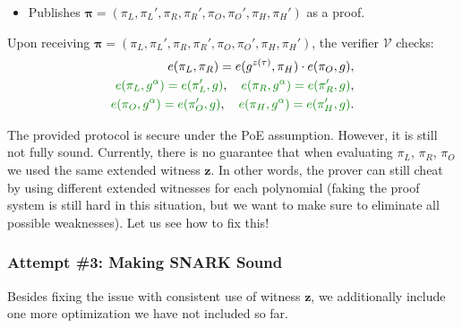 \documentclass[../lecture-notes-148x210.tex]{subfiles}
\begin{document}
\begin{tcolorbox}
\begin{itemize}[label=]
\begin{align*}
            \pi_R \gets g^{r(\tau)}, & \quad\textcolor{green!50!black}{\pi_R' \gets g^{\alpha r(\tau)}} \\
            \pi_O \gets g^{o(\tau)}, & \quad\textcolor{green!50!black}{\pi_O' \gets g^{\alpha o(\tau)}} \\
            \pi_H \gets g^{h(\tau)}, & \quad\textcolor{green!50!black}{\pi_H' \gets g^{\alpha h(\tau)}}.
        \end{align*}
        using powers $\{g^{\tau^i}\}_{i \in [d]}$ and $\{g^{\alpha\tau^i}\}_{i \in [d]}$ from the proper parameters $\mathsf{pp}$.
        \item Publishes $\boldsymbol{\pi} = (\pi_L,\pi_L',\pi_R,\pi_R',\pi_O,\pi_O',\pi_H,\pi_H')$ as a proof.
    \end{itemize}
    Upon receiving $\boldsymbol{\pi} = (\pi_L,\pi_L',\pi_R,\pi_R',\pi_O,\pi_O',\pi_H,\pi_H')$, the verifier $\mathcal{V}$ checks:
    \begin{align*}
        e(\pi_L, \pi_R) = e(g^{z(\tau)}, \pi_H) \cdot e(\pi_O, g), \\
        \textcolor{green!50!black}{e(\pi_L, g^{\alpha}) = e(\pi_L', g)}, \quad \textcolor{green!50!black}{e(\pi_R, g^{\alpha}) = e(\pi_R', g)}, \\
        \textcolor{green!50!black}{e(\pi_O, g^{\alpha}) = e(\pi_O', g)}, \quad \textcolor{green!50!black}{e(\pi_H, g^{\alpha}) = e(\pi_H', g)}.
    \end{align*}
\end{tcolorbox}

The provided protocol is secure under the PoE assumption. However, it is still not fully sound. Currently, there is no guarantee that when evaluating $\pi_L$, $\pi_R$, $\pi_O$ we used the same extended witness $\mathbf{z}$. In other words, the prover can still cheat by using different extended witnesses for each polynomial (faking the proof system is still hard in this situation, but we want to make sure to eliminate all possible weaknesses). Let us see how to fix this!

\subsubsection{Attempt \#3: Making SNARK Sound}

Besides fixing the issue with consistent use of witness $\mathbf{z}$, we
additionally include one more optimization we have not included so far.
\end{document}

